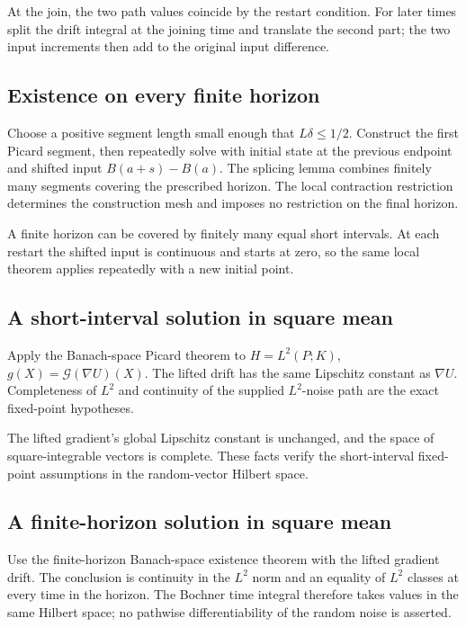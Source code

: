 \documentclass[11pt,a4paper]{article}
\begin{document}
At the join, the two path values coincide by the restart condition. For later times split the drift integral at the joining time and translate the second part; the two input increments then add to the original input difference.


\subsection{\texorpdfstring{Existence on every finite horizon}{Existence on every finite horizon}}


Choose a positive segment length small enough that \(L\delta\le1/2\). Construct the first Picard segment, then repeatedly solve with initial state at the previous endpoint and shifted input \(B(a+s)-B(a)\). The splicing lemma combines finitely many segments covering the prescribed horizon. The local contraction restriction determines the construction mesh and imposes no restriction on the final horizon.



A finite horizon can be covered by finitely many equal short intervals. At each restart the shifted input is continuous and starts at zero, so the same local theorem applies repeatedly with a new initial point.


\subsection{\texorpdfstring{A short-interval solution in square mean}{A short-interval solution in square mean}}


Apply the Banach-space Picard theorem to \(H=L^2(P;K)\), \(g(X)=\mathcal G(\nabla U)(X)\). The lifted drift has the same Lipschitz constant as \(\nabla U\). Completeness of \(L^2\) and continuity of the supplied \(L^2\)-noise path are the exact fixed-point hypotheses.



The lifted gradient's global Lipschitz constant is unchanged, and the space of square-integrable vectors is complete. These facts verify the short-interval fixed-point assumptions in the random-vector Hilbert space.


\subsection{\texorpdfstring{A finite-horizon solution in square mean}{A finite-horizon solution in square mean}}


Use the finite-horizon Banach-space existence theorem with the lifted gradient drift. The conclusion is continuity in the \(L^2\) norm and an equality of \(L^2\) classes at every time in the horizon. The Bochner time integral therefore takes values in the same Hilbert space; no pathwise differentiability of the random noise is asserted.
\end{document}

